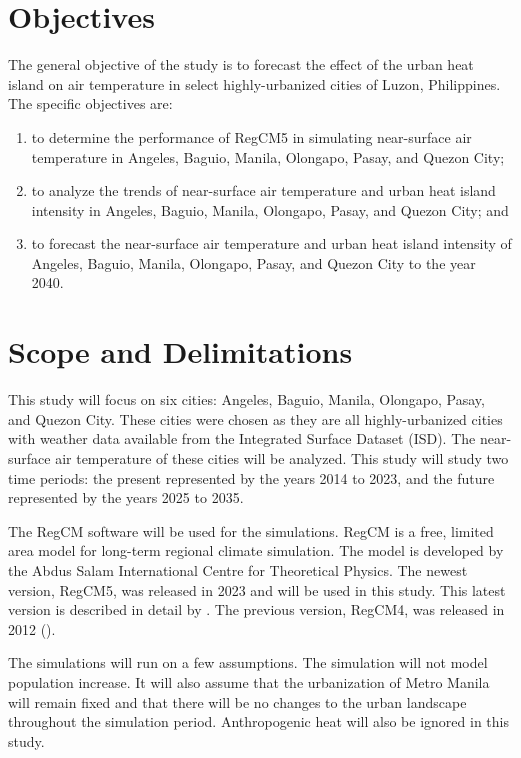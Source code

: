 \section{Objectives}
	The general objective of the study is to forecast the effect of the urban heat island on air temperature in select highly-urbanized cities of Luzon, Philippines.
	The specific objectives are:
	\begin{enumerate}
		\item to determine the performance of RegCM5 in simulating near-surface air temperature in Angeles, Baguio, Manila, Olongapo, Pasay, and Quezon City;
		\item to analyze the trends of near-surface air temperature and urban heat island intensity in Angeles, Baguio, Manila, Olongapo, Pasay, and Quezon City; and
		\item to forecast the near-surface air temperature and urban heat island intensity of Angeles, Baguio, Manila, Olongapo, Pasay, and Quezon City to the year 2040.
	\end{enumerate}
	

\section{Scope and Delimitations}
	This study will focus on six cities: Angeles, Baguio, Manila, Olongapo, Pasay, and Quezon City.
	These cities were chosen as they are all highly-urbanized cities with weather data available from the Integrated Surface Dataset (ISD).
	The near-surface air temperature of these cities will be analyzed.
	This study will study two time periods: 
		the present represented by the years 2014 to 2023, 
		and the future represented by the years 2025 to 2035.

	The RegCM software will be used for the simulations.
	RegCM is a free, limited area model for long-term regional climate simulation.
	The model is developed by the Abdus Salam International Centre for Theoretical Physics.
	The newest version, RegCM5, was released in 2023 and will be used in this study.
	This latest version is described in detail by \textcite{Giorgi2023}. 
	The previous version, RegCM4, was released in 2012 (\textcite{Giorgi2012}).
	
	The simulations will run on a few assumptions.
	The simulation will not model population increase.
	It will also assume that the urbanization of Metro Manila will remain fixed and that there will be no changes to the urban landscape throughout the simulation period.
	Anthropogenic heat will also be ignored in this study.